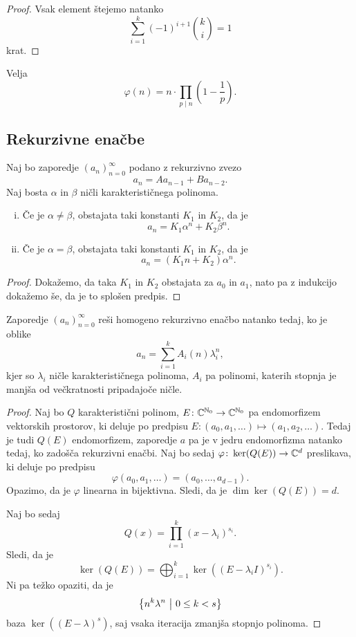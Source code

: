 \begin{proof}
Vsak element štejemo natanko
\[
\sum_{i=1}^k (-1)^{i+1} \binom{k}{i} = 1
\]
krat.
\end{proof}

\begin{izrek}
Velja
\[
\varphi(n) = n \cdot \prod_{p \mid n} \left(1 - \frac{1}{p}\right).
\]
\end{izrek}

\obvs

\newpage

\subsection{Rekurzivne enačbe}


\begin{izrek}
Naj bo zaporedje $(a_n)_{n=0}^\infty$ podano z rekurzivno zvezo
\[
a_n = A a_{n-1} + B a_{n-2}.
\]
Naj bosta $\alpha$ in $\beta$ ničli karakterističnega polinoma.

\begin{enumerate}[i)]
\item Če je $\alpha \ne \beta$, obstajata taki konstanti $K_1$ in
$K_2$, da je
\[
a_n = K_1 \alpha^n + K_2 \beta^n.
\]
\item Če je $\alpha = \beta$, obstajata taki konstanti $K_1$ in
$K_2$, da je
\[
a_n = (K_1 n + K_2) \alpha^n.
\]
\end{enumerate}
\end{izrek}

\begin{proof}
Dokažemo, da taka $K_1$ in $K_2$ obstajata za $a_0$ in $a_1$, nato
pa z indukcijo dokažemo še, da je to splošen predpis.
\end{proof}

\begin{izrek}
Zaporedje $(a_n)_{n=0}^\infty$ reši homogeno rekurzivno enačbo
natanko tedaj, ko je oblike
\[
a_n = \sum_{i=1}^k A_i(n) \lambda_i^n,
\]
kjer so $\lambda_i$ ničle karakterističnega polinoma, $A_i$ pa
polinomi, katerih stopnja je manjša od večkratnosti pripadajoče
ničle.
\end{izrek}

\begin{proof}
Naj bo $Q$ karakteristični polinom,
$E \colon \mathbb{C}^{\mathbb{N}_0} \to \mathbb{C}^{\mathbb{N}_0}$ pa endomorfizem vektorskih
prostorov, ki deluje po predpisu
$E \colon (a_0, a_1, \dots) \mapsto (a_1, a_2, \dots)$. Tedaj je
tudi $Q(E)$ endomorfizem, zaporedje $a$ pa je v jedru endomorfizma
natanko tedaj, ko zadošča rekurzivni enačbi. Naj bo sedaj
$\varphi \colon \ker(Q(E)) \to \mathbb{C}^d$ preslikava, ki deluje po
predpisu
\[
\varphi(a_0, a_1, \dots) = (a_0, \dots, a_{d-1}).
\]
Opazimo, da je $\varphi$ linearna in bijektivna. Sledi, da je
$\dim \ker(Q(E)) = d$.

Naj bo sedaj
\[
Q(x) = \prod_{i=1}^k (x - \lambda_i)^{s_i}.
\]
Sledi, da je
\[
\ker(Q(E)) = \bigoplus_{i=1}^k \ker((E-\lambda_i I)^{s_i}).
\]
Ni pa težko opaziti, da je
\[
\left\{n^k \lambda^n~\middle\vert~0 \leq k < s\right\}
\]
baza $\ker((E-\lambda)^s)$, saj vsaka iteracija zmanjša stopnjo
polinoma.
\end{proof}

